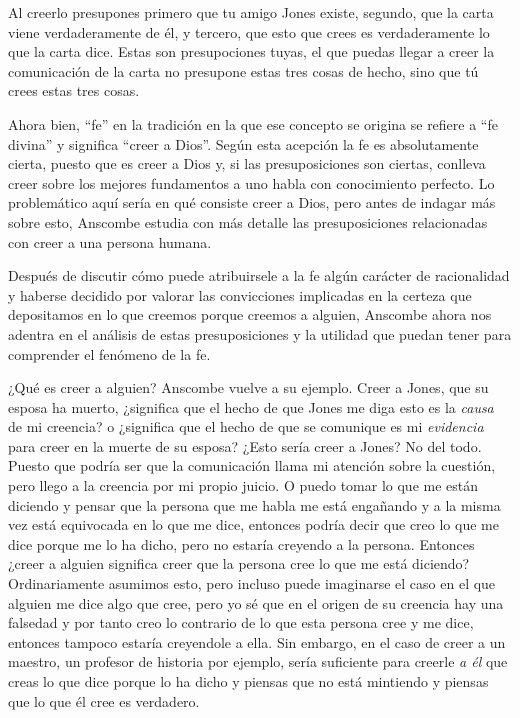 Al creerlo presupones primero que tu amigo Jones existe, segundo, que la carta viene verdaderamente de él, y tercero, que esto que crees es verdaderamente lo que la carta dice. Estas son presupociones tuyas, el que puedas llegar a creer la comunicación de la carta no presupone estas tres cosas de hecho, sino que tú crees estas tres cosas.

Ahora bien, ``fe'' en la tradición en la que ese concepto se origina se refiere a ``fe divina'' y significa ``creer a Dios''. Según esta acepción la fe es absolutamente cierta, puesto que es creer a Dios y, si las presuposiciones son ciertas, conlleva creer sobre los mejores fundamentos a uno habla con conocimiento perfecto. Lo problemático aquí sería en qué consiste creer a Dios, pero antes de indagar más sobre esto, Anscombe estudia con más detalle las presuposiciones relacionadas con creer a una persona humana.

Después de discutir cómo puede atribuirsele a la fe algún carácter de racionalidad y haberse decidido por valorar las convicciones implicadas en la certeza que depositamos en lo que creemos porque creemos a alguien, Anscombe ahora nos adentra en el análisis de estas presuposiciones y la utilidad que puedan tener para comprender el fenómeno de la fe.

¿Qué es creer a alguien? Anscombe vuelve a su ejemplo. Creer a Jones, que su esposa ha muerto, ¿significa que el hecho de que Jones me diga esto es la \emph{causa} de mi creencia? o ¿significa que el hecho de que se comunique es mi \emph{evidencia} para creer en la muerte de su esposa? ¿Esto sería creer a Jones? No del todo. Puesto que podría ser que la comunicación llama mi atención sobre la cuestión, pero llego a la creencia por mi propio juicio. O puedo tomar lo que me están diciendo y pensar que la persona que me habla me está engañando y a la misma vez está equivocada en lo que me dice, entonces podría decir que creo lo que me dice porque me lo ha dicho, pero no estaría creyendo a la persona. Entonces ¿creer a alguien significa creer que la persona cree lo que me está diciendo? Ordinariamente asumimos esto, pero incluso puede imaginarse el caso en el que alguien me dice algo que cree, pero yo sé que en el origen de su creencia hay una falsedad y por tanto creo lo contrario de lo que esta persona cree y me dice, entonces tampoco estaría creyendole a ella. Sin embargo, en el caso de creer a un maestro, un profesor de historia por ejemplo, sería suficiente para creerle \emph{a él} que creas lo que dice porque lo ha dicho y piensas que no está mintiendo y piensas que lo que él cree es verdadero.

